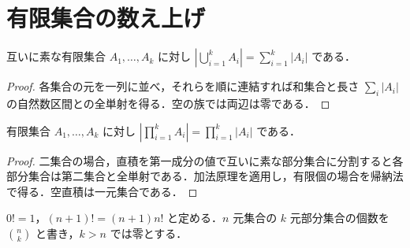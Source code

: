 \section{有限集合の数え上げ}
\begin{prop}[加法原理]
互いに素な有限集合 $A_1,\ldots,A_k$ に対し $\left|\bigcup_{i=1}^kA_i\right|=\sum_{i=1}^k|A_i|$ である．
\end{prop}
\begin{proof}
各集合の元を一列に並べ，それらを順に連結すれば和集合と長さ $\sum_i|A_i|$ の自然数区間との全単射を得る．空の族では両辺は零である．
\end{proof}
\begin{prop}[乗法原理]
有限集合 $A_1,\ldots,A_k$ に対し $\left|\prod_{i=1}^kA_i\right|=\prod_{i=1}^k|A_i|$ である．
\end{prop}
\begin{proof}
二集合の場合，直積を第一成分の値で互いに素な部分集合に分割すると各部分集合は第二集合と全単射である．加法原理を適用し，有限個の場合を帰納法で得る．空直積は一元集合である．
\end{proof}
\begin{defn}[階乗と二項係数]
$0!=1$，$(n+1)!=(n+1)n!$ と定める．$n$ 元集合の $k$ 元部分集合の個数を $\binom nk$ と書き，$k>n$ では零とする．
\end{defn}

